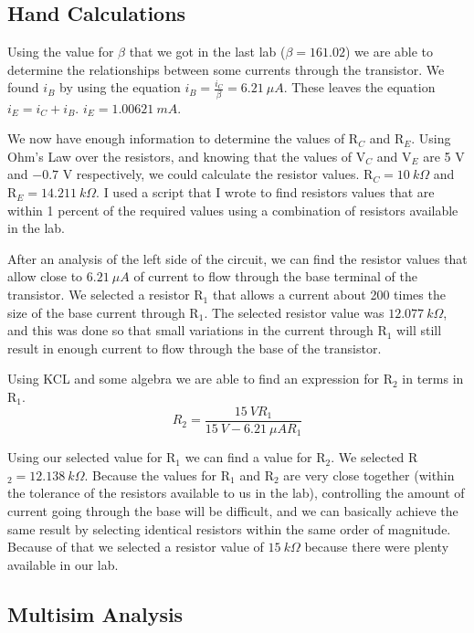 \documentclass{article}
\begin{document}
\subsection{Hand Calculations}

Using the value for $\beta$ that we got in the last lab
($\beta=161.02$) we are able to determine the relationships
between some currents through the transistor. We found
$i_B$ by using the equation $i_B=\frac{i_C}{\beta}=\SI{6.21}{\mu A}$.
These leaves the equation $i_E=i_C + i_B$. $i_E=\SI{1.00621}{mA}$.

We now have enough information to determine the values
of R$_C$ and R$_E$. Using Ohm's Law over the resistors,
and knowing that the values of V$_C$ and V$_E$ are
5 V and $-0.7$ V respectively, we could calculate the
resistor values. R$_C=\SI{10}{k \Omega}$ and R$_E=\SI{14.211}{k
\Omega}$.  I used a script that I wrote to find resistors
values that are within 1 percent of the required values
using a combination of resistors available in the lab.

After an analysis of the left side of the circuit,
we can find the resistor values that allow close to
$\SI{6.21}{\mu A}$ of current to flow through the base
terminal of the transistor.  We selected a resistor
R$_1$ that allows a current about 200 times the size
of the base current through R$_1$.  The selected resistor
value was $\SI{12.077}{k \Omega}$, and this was done
so that small variations in the current through R$_1$
will still result in enough current to flow through
the base of the transistor.

Using KCL and some algebra we are able to find an
expression for R$_2$ in terms in R$_1$. 
$$R_2=\frac{\SI{15}{V} R_1}{\SI{15}{V} - \SI{6.21}{\mu A} R_1}$$

Using our selected value for R$_1$ we can find a value
for R$_2$.  We selected R$_2=\SI{12.138}{k \Omega}$.
Because the values for R$_1$ and R$_2$ are very close
together (within the tolerance of the resistors available
to us in the lab), controlling the amount of current
going through the base will be difficult, and we can
basically achieve the same result by selecting identical
resistors within the same order of magnitude. Because
of that we selected a resistor value of $\SI{15}{k \Omega}$
because there were plenty available in our lab.

\subsection{Multisim Analysis}
\end{document}
